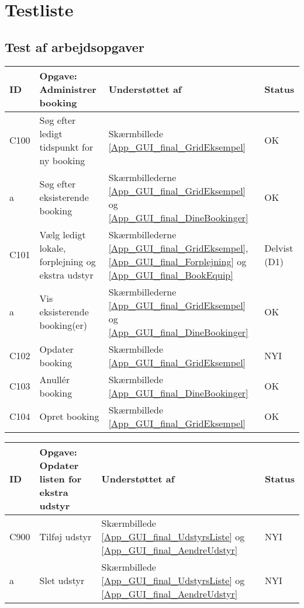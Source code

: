 \section{Testliste}
\label{App_Test_ListOfTest}

\subsection{Test af arbejdsopgaver}
\label{App_Test_ListOfTest_Work}

\begin{longtable}{ |p{0.85cm}| p{7cm} | p{5.5cm} | p{2cm} | }
\hline
ID & Opgave: Administrer booking & Understøttet af & Status\\ 
\hline
C100 & Søg efter ledigt tidspunkt for ny booking & Skærmbillede \ref{App_GUI_final_GridEksempel} & OK \\
\hline
a & Søg efter eksisterende booking & Skærmbillederne \ref{App_GUI_final_GridEksempel}  og \ref{App_GUI_final_DineBookinger} & OK \\
\hline
C101 & Vælg ledigt lokale, forplejning og ekstra udstyr & Skærmbillederne \ref{App_GUI_final_GridEksempel}, \ref{App_GUI_final_Forplejning} og \ref{App_GUI_final_BookEquip}  & Delvist (D1) \\
\hline
a & Vis eksisterende booking(er) & Skærmbillederne \ref{App_GUI_final_GridEksempel} og \ref{App_GUI_final_DineBookinger} & OK \\
\hline
C102 & Opdater booking & Skærmbillede \ref{App_GUI_final_GridEksempel} & NYI \\
\hline
C103 & Anullér booking & Skærmbillede \ref{App_GUI_final_DineBookinger} & OK \\
\hline
C104 & Opret booking & Skærmbillede \ref{App_GUI_final_GridEksempel} & OK \\
\hline
\end{longtable}

\begin{longtable}{ |p{0.85cm}| p{7cm} | p{5.5cm} | p{2cm} | }
\hline
ID & Opgave: Opdater listen for ekstra udstyr & Understøttet af & Status\\ 
\hline
C900 & Tilføj udstyr & Skærmbillede \ref{App_GUI_final_UdstyrsListe} og \ref{App_GUI_final_AendreUdstyr} & NYI \\
\hline
a & Slet udstyr & Skærmbillede \ref{App_GUI_final_UdstyrsListe} og \ref{App_GUI_final_AendreUdstyr} & NYI \\
\hline
\end{longtable}

